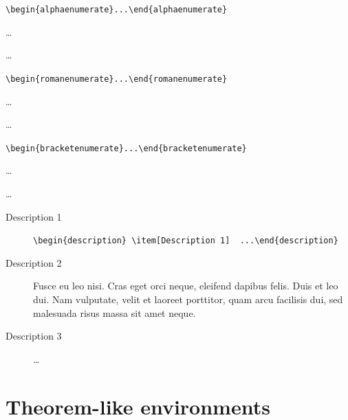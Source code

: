 \documentclass[a4paper,ngerman]{tui-algo-seminar}
\begin{document}
\begin{alphaenumerate}
\item \verb|\begin{alphaenumerate}...\end{alphaenumerate}|
\item \dots
\item \dots
\end{alphaenumerate}

\begin{romanenumerate}
\item \verb|\begin{romanenumerate}...\end{romanenumerate}|
\item \dots
\item \dots
\end{romanenumerate}

\begin{bracketenumerate}
\item \verb|\begin{bracketenumerate}...\end{bracketenumerate}|
\item \dots
\item \dots
\end{bracketenumerate}

\begin{description}
\item[Description 1] \verb|\begin{description} \item[Description 1]  ...\end{description}|
\item[Description 2] Fusce eu leo nisi. Cras eget orci neque, eleifend dapibus felis. Duis et leo dui. Nam vulputate, velit et laoreet porttitor, quam arcu facilisis dui, sed malesuada risus massa sit amet neque.
\item[Description 3]  \dots
\end{description}


\section{Theorem-like environments}
\label{sec:theorem-environments}
\end{document}
